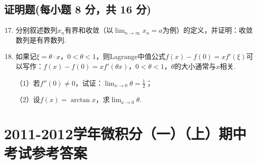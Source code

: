 \documentclass[../main.tex]{subfiles}
\begin{document}
\section{证明题(每小题 8 分，共 16 分)}
\begin{enumerate}
    \setcounter{enumi}{16}
    \item 分别叙述数列$x_{n}$有界和收敛（以$\lim_{n\to\infty}x_{n}=a$为例）的定义，并证明：收敛数列是有界数列.
          \vspace{12em}

    \item 如果记$\xi=\theta\cdot x$，$0<\theta<1$，则Lagrange中值公式$f(x)-f
              (0)=xf'(\xi)$可以写作：$f(x)-f(0)=xf'(\theta x)$，$0<\theta<1$，$\theta$的大小通常与$x$相关.

          （1）若$f''(0)\neq0$，试证：$\lim_{x\to0}\theta=\frac{1}{2}$；

          （2）设$f(x)=\arctan x$，求$\lim_{x\to0}\theta$.
          \vspace{12em}
\end{enumerate}

\chapter{2011-2012学年微积分（一）（上）期中考试参考答案}
\end{document}
